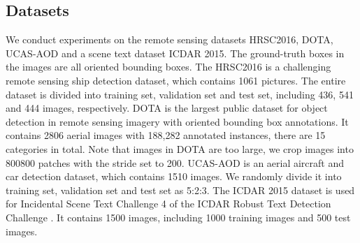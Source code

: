 \documentclass[letterpaper]{article} \usepackage{aaai21}  \usepackage{times}  \usepackage{helvet} \usepackage{courier}  \usepackage[hyphens]{url}  \usepackage{graphicx} \urlstyle{rm} \def\UrlFont{\rm}  \usepackage{natbib}  \usepackage{caption} \frenchspacing  \setlength{\pdfpagewidth}{8.5in}  \setlength{\pdfpageheight}{11in}  \usepackage{url}
\begin{document}
\subsection{Datasets}
We conduct experiments on the remote sensing datasets HRSC2016, DOTA, UCAS-AOD and a scene text dataset ICDAR 2015. The ground-truth boxes in the images are all oriented bounding boxes. The HRSC2016 \cite{lb2017high} is a challenging remote sensing ship detection dataset, which contains 1061 pictures. The entire dataset is divided into training set, validation set and test set, including 436, 541 and 444 images, respectively. DOTA \cite{xia2018dota}  is the largest public dataset for object detection in remote sensing imagery with oriented bounding box annotations. It contains 2806 aerial images with 188,282 annotated instances, there are 15 categories in total. Note that images in DOTA are too large, we crop images into 800800 patches with the stride set to 200. UCAS-AOD \cite{zhu2015orientation} is an aerial aircraft and car detection dataset, which contains 1510 images. We  randomly divide it into training set, validation set and test set as 5:2:3. The ICDAR 2015 dataset is used for Incidental Scene Text Challenge 4 of the ICDAR Robust Text Detection Challenge \cite{karatzas2015icdar}. It contains 1500 images, including 1000 training images and 500 test images.          
\begin{table}[t]
	\centering
	\small
\caption{Effects of each component in our method on HRSC2016 dataset.}
	\label{table1}
\end{table}
\end{document}
